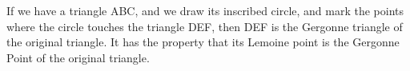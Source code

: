 If we have a triangle ABC, and we draw its inscribed circle, and mark the points 
where the circle touches the triangle DEF, then DEF is the Gergonne triangle of 
the original triangle. It has the property that its Lemoine point is the Gergonne
Point of the original triangle.